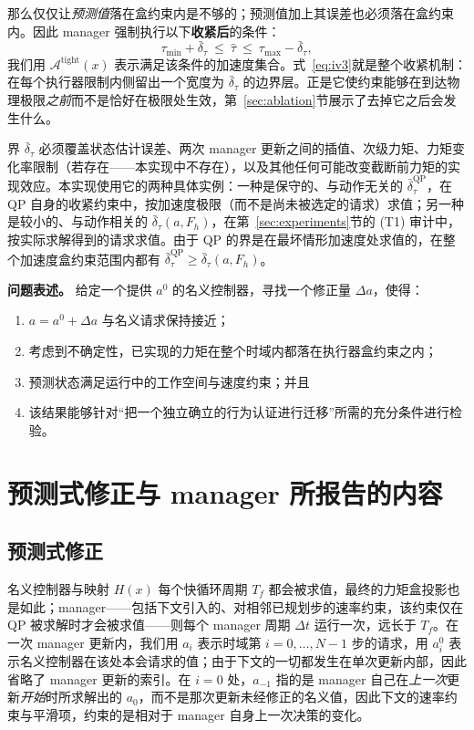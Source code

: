 \documentclass[journal]{IEEEtran}
\begin{document}
那么仅仅让\emph{预测值}落在盒约束内是不够的；预测值加上其误差也必须落在盒约束内。因此 manager 强制执行以下\textbf{收紧后}的条件：
\begin{equation}
\tau_{\min}+\bar\delta_\tau\ \le\ \hat\tau\ \le\ \tau_{\max}-\bar\delta_\tau,
\label{eq:iv3}
\end{equation}
我们用 $\mathcal A^{\mathrm{tight}}(x)$ 表示满足该条件的加速度集合。式~\eqref{eq:iv3}就是整个收紧机制：在每个执行器限制内侧留出一个宽度为 $\bar\delta_\tau$ 的边界层。正是它使约束能够在到达物理极限\emph{之前}而不是恰好在极限处生效，第~\ref{sec:ablation}节展示了去掉它之后会发生什么。

界 $\bar\delta_\tau$ 必须覆盖状态估计误差、两次 manager 更新之间的插值、次级力矩、力矩变化率限制（若存在——本实现中不存在），以及其他任何可能改变截断前力矩的实现效应。本实现使用它的两种具体实例：一种是保守的、与动作无关的 $\bar\delta_\tau^{\mathrm{QP}}$，在 QP 自身的收紧约束中，按加速度极限（而不是尚未被选定的请求）求值；另一种是较小的、与动作相关的 $\bar\delta_\tau(a,F_h)$，在第~\ref{sec:experiments}节的 (T1) 审计中，按实际求解得到的请求求值。由于 QP 的界是在最坏情形加速度处求值的，在整个加速度盒约束范围内都有 $\bar\delta_\tau^{\mathrm{QP}}\ge\bar\delta_\tau(a,F_h)$。

\textbf{问题表述。} 给定一个提供 $a^{0}$ 的名义控制器，寻找一个修正量 $\Delta a$，使得：
\begin{enumerate}
\item $a=a^{0}+\Delta a$ 与名义请求保持接近；
\item 考虑到不确定性，已实现的力矩在整个时域内都落在执行器盒约束之内；
\item 预测状态满足运行中的工作空间与速度约束；并且
\item 该结果能够针对“把一个独立确立的行为认证进行迁移”所需的充分条件进行检验。
\end{enumerate}

\section{预测式修正与 manager 所报告的内容}
\label{sec:correction}

\subsection{预测式修正}
\label{sec:predictivecorrection}

名义控制器与映射 $H(x)$ 每个快循环周期 $T_f$ 都会被求值，最终的力矩盒投影也是如此；manager——包括下文引入的、对相邻已规划步的速率约束，该约束仅在 QP 被求解时才会被求值——则每个 manager 周期 $\Delta t$ 运行一次，远长于 $T_f$。在一次 manager 更新内，我们用 $a_i$ 表示时域第 $i=0,\dots,N-1$ 步的请求，用 $a^0_i$ 表示名义控制器在该处本会请求的值；由于下文的一切都发生在单次更新内部，因此省略了 manager 更新的索引。在 $i=0$ 处，$a_{-1}$ 指的是 manager 自己在\emph{上一次}更新\emph{开始}时所求解出的 $a_0$，而不是那次更新未经修正的名义值，因此下文的速率约束与平滑项，约束的是相对于 manager 自身上一次决策的变化。
\end{document}
